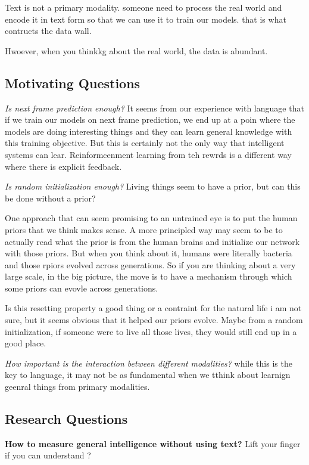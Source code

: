 Text is not a primary modality. someone need to process the real world and encode it in text form so that we can use it to train our models. that is what contructs the data wall. 

Hwoever, when you thinkkg about the real world, the data is abundant. 





\subsection{Motivating Questions}
\textit{Is next frame prediction enough?} It seems from our experience with language that if we train our models on next frame prediction, we end up at a poin where the models are doing interesting things and they can learn general knowledge with this training objective. But this is certainly not the only way that intelligent systems can lear. Reinformcenment learning from teh rewrds is a different way where there is explicit feedback. 

\textit{Is random initialization enough?} Living things seem to have a prior, but can this be done without a prior?

One approach that can seem promising to an untrained eye is to put the human priors that we think makes sense. A more principled way may seem to be to actually read what the prior is from the human brains and initialize our network with those priors. But when you think about it, humans were literally bacteria and those rpiors evolved across generations. So if you are thinking about a very large scale, in the big picture, the move is to have a mechanism through which some priors can evovle across generations. 

Is this resetting property a good thing or a contraint for the natural life i am not sure, but it seems obvious that it helped our priors evolve. Maybe from a random initialization, if someone were to live all those lives, they would still end up in a good place. 

\textit{How important is the interaction between different modalities?} while this is the key to language, it may not be as fundamental when we tthink about learnign geenral things from primary modalities. 

\subsection{Research Questions}

\textbf{How to measure general intelligence without using text?}
Lift your finger if you can understand ?

